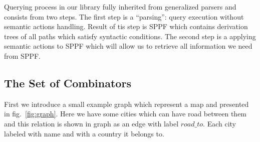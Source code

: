 
Querying process in our library fully inherited from generalized parsers and consists from two steps.
The first step is a ``parsing'': query execution without semantic actions handling.
Result of tis step is SPPF which contains derivation trees of all paths which satisfy syntactic conditions.
The second step is a applying semantic actions to SPPF which will allow us to retrieve all information we need from SPPF. 

\subsection{The Set of Combinators}

First we introduce a small example graph which represent a map and presented in fig.~\ref{fig:graph}.
Here we have some cities which can have road between them and this relation is shown in graph as an edge with label $road\_to$.
Each city labeled with name and with a country it belongs to.

